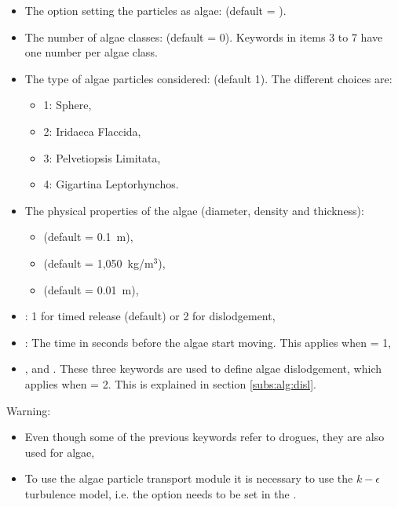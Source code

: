 \begin{itemize}
\item The option setting the particles as algae:
 (default = ).

\item The number of algae classes: 
(default = 0).
Keywords in items 3 to 7 have one number per algae class.

\item The type of algae particles considered:  (default 1).
The different choices are:

\begin{itemize}
\item 1: Sphere,
\item 2: Iridaeca Flaccida,
\item 3: Pelvetiopsis Limitata,
\item 4: Gigartina Leptorhynchos.
\end{itemize}

\item The physical properties of the algae (diameter, density and thickness):
\begin{itemize}
\item {} (default = 0.1~m),
\item {} (default = 1,050~kg/m$^3$),
\item {} (default = 0.01~m),
\end{itemize}

\item {}: 1 for timed release (default)
or 2 for dislodgement,

\item {}:
The time in seconds before the algae start moving.
This applies when  = 1,

\item {},
and .
These three keywords are used to define algae dislodgement, which applies when
 = 2.
This is explained in section \ref{subs:alg:disl}.

\end{itemize}

\begin{WarningBlock}{Warning:}

\begin{itemize}
\item Even though some of the previous keywords refer to drogues,
they are also used for algae,

\item To use the algae particle transport module it is necessary to use the
$k-\epsilon$ turbulence model, i.e. the option 
needs to be set in the .
\end{itemize}
\end{WarningBlock}

